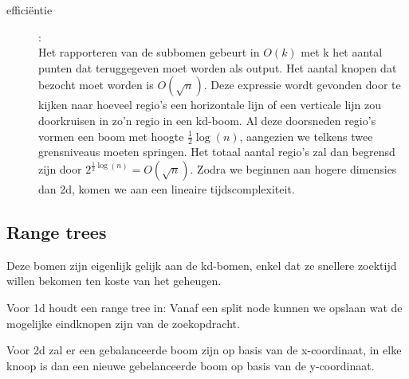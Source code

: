 \documentclass[12pt,a4paper]{article}
\begin{document}
\begin{description}
\begin{figure}[h]
			\label{fig:kd-zoeken}
		\end{figure}
		\item[efficiëntie]:\\
		Het rapporteren van de subbomen gebeurt in $O(k)$ met k het aantal punten dat teruggegeven moet worden als output. Het aantal knopen dat bezocht moet worden is $O(\sqrt{n})$. Deze expressie wordt gevonden door te kijken naar hoeveel regio's een horizontale lijn of een verticale lijn zou doorkruisen in zo'n regio in een kd-boom. Al deze doorsneden regio's vormen een boom met hoogte $\tfrac{1}{2}\log(n)$, aangezien we telkens twee grensniveaus moeten springen. Het totaal aantal regio's zal dan begrensd zijn door $2^{\frac{1}{2}\log(n)} = O(\sqrt{n})$. Zodra we beginnen aan hogere dimensies dan 2d, komen we aan een lineaire tijdscomplexiteit. 
	\end{description}
	
	
	\subsection{Range trees}
	Deze bomen zijn eigenlijk gelijk aan de kd-bomen, enkel dat ze snellere zoektijd willen bekomen ten koste van het geheugen. 
	
	Voor 1d houdt een range tree in: Vanaf een split node kunnen we opslaan wat de mogelijke eindknopen zijn van de zoekopdracht. 
	
	Voor 2d zal er een gebalanceerde boom zijn op basis van de x-coordinaat, in elke knoop is dan een nieuwe gebelanceerde boom op basis van de y-coordinaat. 
	
\end{document}
